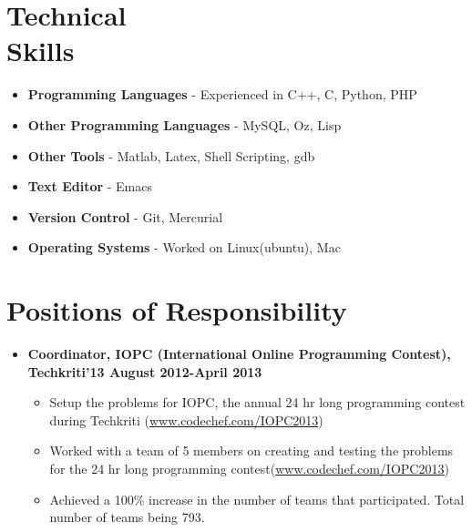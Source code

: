 \documentclass[margin,line]{resume}
\begin{document}
\begin{resume}
    \section{\mysidestyle Technical \\Skills} 

    \begin{itemize}
\item \textbf{\textsf{Programming Languages}} - Experienced in C++, C, Python, PHP
\item \textbf{\textsf{Other Programming Languages}} -  MySQL, Oz, Lisp
\item \textbf{\textsf{Other Tools}} - Matlab, Latex, Shell Scripting, gdb
\item \textbf{\textsf{Text Editor}} - Emacs
\item \textbf{\textsf{Version Control}} - Git, Mercurial
\item \textbf{\textsf{Operating Systems}} - Worked on Linux(ubuntu), Mac
\end{itemize}

    \section{\mysidestyle Positions of Responsibility} 

    \begin{itemize}

    \item  \textbf{\textsf{Coordinator, IOPC (International Online Programming Contest), Techkriti'13 August 2012-April 2013}}
      \begin{itemize}
      \item Setup the problems for IOPC, the annual 24 hr long programming contest during Techkriti (\url{www.codechef.com/IOPC2013})
      \item Worked with a team of 5 members on creating and testing the problems for the 24 hr long programming contest(\url{www.codechef.com/IOPC2013})

        \newpage

      \item Achieved a 100\% increase in the number of teams that participated. Total number of teams being 793. 
      \end{itemize}
      

\end{itemize}
\end{resume}
\end{document}
